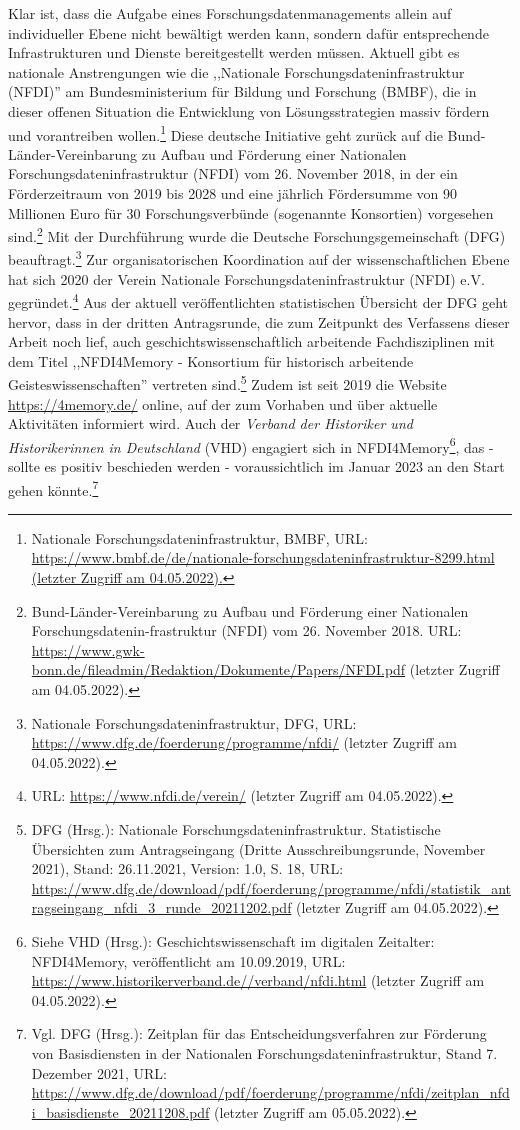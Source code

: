 Klar ist, dass die Aufgabe eines Forschungsdatenmanagements allein auf individueller Ebene nicht bewältigt werden kann, sondern dafür entsprechende Infrastrukturen und Dienste bereitgestellt werden müssen. Aktuell gibt es nationale Anstrengungen wie die ,,Nationale Forschungsdateninfrastruktur (NFDI)'' am Bundesministerium für Bildung und Forschung (BMBF), die in dieser offenen Situation die Entwicklung von Lösungsstrategien massiv fördern und vorantreiben wollen.\footnote{Nationale Forschungsdateninfrastruktur, BMBF, URL: \url{https://www.bmbf.de/de/nationale-forschungsdateninfrastruktur-8299.html (letzter Zugriff am 04.05.2022).}} Diese deutsche Initiative geht zurück auf die Bund-Länder-Vereinbarung zu Aufbau und Förderung einer Nationalen Forschungsdateninfrastruktur (NFDI) vom 26. November 2018, in der ein Förderzeitraum von 2019 bis 2028 und eine jährlich Fördersumme von 90 Millionen Euro für 30 Forschungsverbünde (sogenannte Konsortien) vorgesehen sind.\footnote{Bund-Länder-Vereinbarung zu Aufbau und Förderung einer Nationalen Forschungsdatenin-frastruktur (NFDI) vom 26. November 2018. URL: \url{https://www.gwk-bonn.de/fileadmin/Redaktion/Dokumente/Papers/NFDI.pdf} (letzter Zugriff am 04.05.2022).} Mit der Durchführung wurde die Deutsche Forschungsgemeinschaft (DFG) beauftragt.\footnote{Nationale Forschungsdateninfrastruktur, DFG, URL: \url{https://www.dfg.de/foerderung/programme/nfdi/} (letzter Zugriff am 04.05.2022).} Zur organisatorischen Koordination auf der wissenschaftlichen Ebene hat sich 2020 der Verein Nationale Forschungsdateninfrastruktur (NFDI) e.V. gegründet.\footnote{URL: \url{https://www.nfdi.de/verein/} (letzter Zugriff am 04.05.2022).} Aus der aktuell veröffentlichten statistischen Übersicht der DFG geht hervor, dass in der dritten Antragsrunde, die zum Zeitpunkt des Verfassens dieser Arbeit noch lief, auch geschichtswissenschaftlich arbeitende Fachdisziplinen mit dem Titel ,,NFDI4Memory - Konsortium für historisch arbeitende Geisteswissenschaften'' vertreten sind.\footnote{DFG (Hrsg.): Nationale Forschungsdateninfrastruktur. Statistische Übersichten zum Antragseingang (Dritte Ausschreibungsrunde, November 2021), Stand: 26.11.2021, Version: 1.0, S. 18, URL: \url{https://www.dfg.de/download/pdf/foerderung/programme/nfdi/statistik_antragseingang_nfdi_3_runde_20211202.pdf} (letzter Zugriff am 04.05.2022).} Zudem ist seit 2019 die Website \url{https://4memory.de/} online, auf der zum Vorhaben und über aktuelle Aktivitäten informiert wird. Auch der \textit{Verband der Historiker und Historikerinnen in Deutschland} (VHD) engagiert sich in NFDI4Memory\footnote{Siehe VHD (Hrsg.): Geschichtswissenschaft im digitalen Zeitalter: NFDI4Memory, veröffentlicht am 10.09.2019, URL: \url{https://www.historikerverband.de//verband/nfdi.html} (letzter Zugriff am 04.05.2022).}, das - sollte es positiv beschieden werden - voraussichtlich im Januar 2023 an den Start gehen könnte.\footnote{Vgl. DFG (Hrsg.): Zeitplan für das Entscheidungsverfahren zur Förderung von Basisdiensten in der Nationalen Forschungsdateninfrastruktur, Stand 7. Dezember 2021, URL: \url{https://www.dfg.de/download/pdf/foerderung/programme/nfdi/zeitplan_nfdi_basisdienste_20211208.pdf} (letzter Zugriff am 05.05.2022).}

